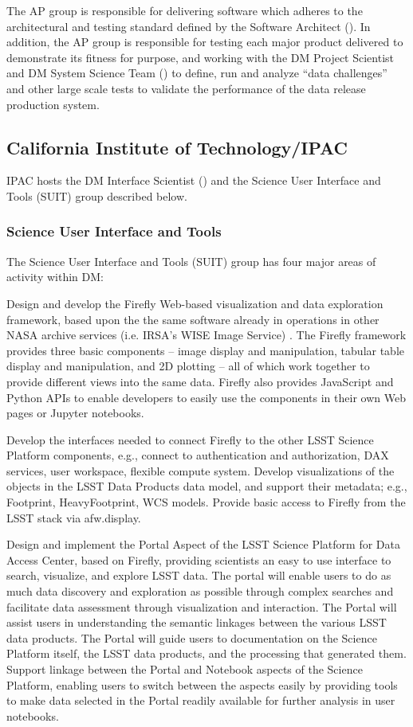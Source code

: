 The AP group is responsible for delivering software which adheres to the architectural and testing standard defined by the Software Architect ().
In addition, the AP group is responsible for testing each major product delivered to demonstrate its fitness for purpose, and working with the DM Project Scientist and DM System Science Team () to define, run and analyze ``data challenges'' and other large scale tests to validate the performance of the data release production system.

\subsection {California Institute of Technology/IPAC\label{sect:ipac}}
IPAC hosts the DM Interface Scientist () and the Science User Interface and Tools (SUIT) group described below.

\subsubsection{ Science User Interface and Tools}

The Science User Interface and Tools (SUIT) group has four major areas of activity within DM:

Design and develop the Firefly Web-based visualization and data exploration framework, based upon the the same software already in operations in other NASA archive services (i.e. IRSA’s WISE Image Service) . The Firefly framework provides three basic components –  image display and manipulation, tabular table display and manipulation, and 2D plotting – all of which work together to provide different views into the same data. Firefly also provides JavaScript and Python APIs to enable developers to easily use the components in their own Web pages or Jupyter notebooks.

Develop the interfaces needed to connect Firefly to the other LSST Science Platform components, e.g., connect to authentication and authorization, DAX services, user workspace, flexible compute system.  Develop visualizations of the objects in the LSST Data Products data model, and support their metadata; e.g., Footprint, HeavyFootprint, WCS models.  Provide basic access to Firefly from the LSST stack via afw.display.

Design and implement the Portal Aspect of the LSST Science Platform for Data Access Center, based on Firefly, providing scientists an easy to use interface to search, visualize, and explore LSST data. The portal will enable users to do as much data discovery and exploration as possible through complex searches and facilitate data assessment through visualization and interaction.  The Portal will assist users in understanding the semantic linkages between the various LSST data products. The Portal will guide users to documentation on the Science Platform itself, the LSST data products, and the processing that generated them.  Support linkage between the Portal and Notebook aspects of the Science Platform, enabling users to switch between the aspects easily by providing tools to make data selected in the Portal readily available for further analysis in user notebooks.

